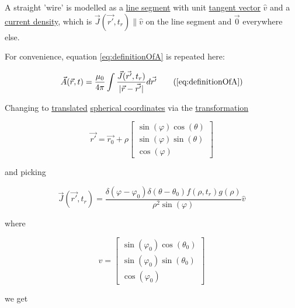 ﻿\documentclass{article}
\begin{document}
A straight 'wire' is modelled as a \href{https://en.wikipedia.org/wiki/Line_segment}{line segment} with unit \href{https://en.wikipedia.org/wiki/Tangent_vector}{tangent vector} $\hat{v}$ and a \href{https://en.wikipedia.org/wiki/Current_density}{current density}, which is $\vec{J}(\vec{r'}, t_r) \parallel \hat{v}$ on the line segment and $\vec{0}$ everywhere else.

For convenience, equation \ref{eq:definitionOfA} is repeated here:

\begin{equation*}
    \vec{A}(\vec{r}, t) = \frac{\mu_0}{4 \pi} \int \frac{\vec{J}(\vec{r'}, t_r)}{|\vec{r} - \vec{r'}|} d \vec{r'}
    \tag{\ref{eq:definitionOfA}}
\end{equation*}

Changing to \href{https://en.wikipedia.org/wiki/Translation_(geometry)}{translated} \href{https://en.wikipedia.org/wiki/Spherical_coordinate_system}{spherical coordinates} via the \href{https://en.wikipedia.org/wiki/Coordinate_system#Transformations}{transformation}

\begin{equation}
    \label{eq:translatedSphericalCoordinatesForStraightWire}
    \vec{r'} = \vec{r_0} + \rho  
    \begin{bmatrix}
    \sin(\varphi) \cos(\theta) \\
    \sin(\varphi) \sin(\theta) \\
    \cos(\varphi)
    \end{bmatrix}
\end{equation}

and picking

\begin{equation}
    \label{eq:JForStraightWire}
    \vec{J}(\vec{r'}, t_r) = \frac{\delta(\varphi - \varphi_0) \delta(\theta - \theta_0) f(\rho, t_r) g(\rho)}{\rho^2 \sin(\varphi)} \hat{v}
\end{equation}

where

\begin{equation}
    \label{eq:vForStraightWire}
    \hat{v} = 
    \begin{bmatrix}
    \sin(\varphi_0) \cos(\theta_0) \\
    \sin(\varphi_0) \sin(\theta_0) \\
    \cos(\varphi_0)
    \end{bmatrix}
\end{equation}

we get
\end{document}
